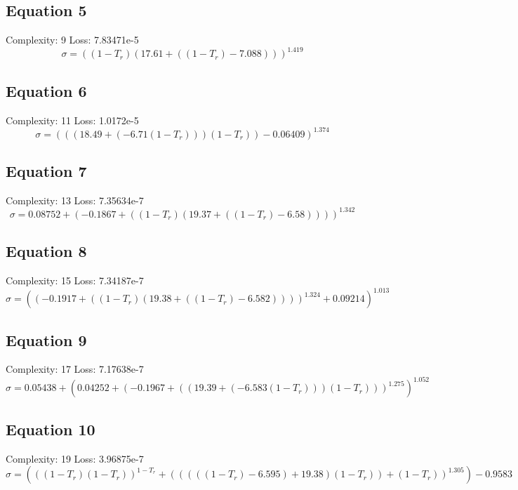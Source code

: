 \documentclass[11pt]{article}
\begin{document}
\subsection*{Equation 5}
\noindent Complexity: 9 \quad Loss: 7.83471e-5 \\[4pt]
\[
\sigma = \left((1 - T_r) (17.61 + ((1 - T_r) -7.088))\right)^{1.419}
\]

\subsection*{Equation 6}
\noindent Complexity: 11 \quad Loss: 1.0172e-5 \\[4pt]
\[
\sigma = \left(((18.49 + (-6.71 (1 - T_r))) (1 - T_r)) - 0.06409\right)^{1.374}
\]

\subsection*{Equation 7}
\noindent Complexity: 13 \quad Loss: 7.35634e-7 \\[4pt]
\[
\sigma = 0.08752 + \left(-0.1867 + ((1 - T_r) (19.37 + ((1 - T_r) -6.58)))\right)^{1.342}
\]

\subsection*{Equation 8}
\noindent Complexity: 15 \quad Loss: 7.34187e-7 \\[4pt]
\[
\sigma = \left(\left(-0.1917 + ((1 - T_r) (19.38 + ((1 - T_r) -6.582)))\right)^{1.324} + 0.09214\right)^{1.013}
\]

\subsection*{Equation 9}
\noindent Complexity: 17 \quad Loss: 7.17638e-7 \\[4pt]
\[
\sigma = 0.05438 + \left(0.04252 + \left(-0.1967 + ((19.39 + (-6.583 (1 - T_r))) (1 - T_r))\right)^{1.275}\right)^{1.052}
\]

\subsection*{Equation 10}
\noindent Complexity: 19 \quad Loss: 3.96875e-7 \\[4pt]
\[
\sigma = (\left((1 - T_r) (1 - T_r)\right)^{1 - T_r} + \left(((((1 - T_r) -6.595) + 19.38) (1 - T_r)) + (1 - T_r)\right)^{1.305}) - 0.9583
\]
\end{document}
